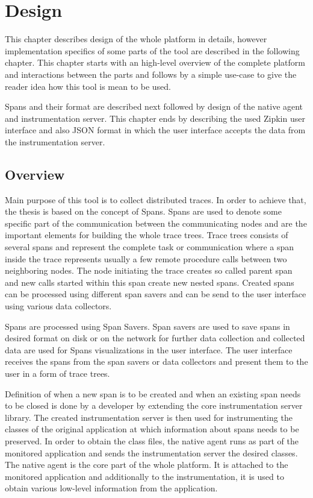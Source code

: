 \chapter{Design}
\label{chap:design}
This chapter describes design of the whole platform in details, however implementation specifics of some parts of the tool are described in the following chapter.  This chapter starts with an high-level overview of the complete platform and interactions between the parts and follows by a simple use-case to give the reader idea how this tool is mean to be used. 

Spans and their format are described next followed by design of the native agent and instrumentation server. This chapter ends by describing the used Zipkin user interface and also JSON format in which the user interface accepts the data from the instrumentation server. 

\section{Overview}
Main purpose of this tool is to collect distributed traces. In order to achieve that, the thesis is based on the concept of Spans. Spans are used to denote some specific part of the communication between the communicating nodes and are the important elements for building the whole trace trees. Trace trees consists of several spans and represent the complete task or communication where a span inside the trace represents usually a few remote procedure calls between two neighboring nodes. The node initiating the trace creates so called parent span and new calls started within this span create new nested spans. Created spans can be processed using different span savers and can be send to the user interface using various data collectors. 

Spans are processed using Span Savers. Span savers are used to save spans in desired format on disk or on the network for further data collection and collected data are used for Spans visualizations in the user interface. The user interface receives the spans from the span savers or data collectors and present them to the user in a form of trace trees.

Definition of when a new span is to be created and when an existing span needs to be closed is done by a developer by extending the core instrumentation server library. The created instrumentation server is then used for instrumenting the classes of the original application at which information about spans needs to be preserved. In order to obtain the class files, the native agent runs  as part of the monitored application and sends the instrumentation server the desired classes. The native agent is the core part of the whole platform. It is attached to the monitored application and additionally to the instrumentation, it is used to obtain various low-level information from the application. 

